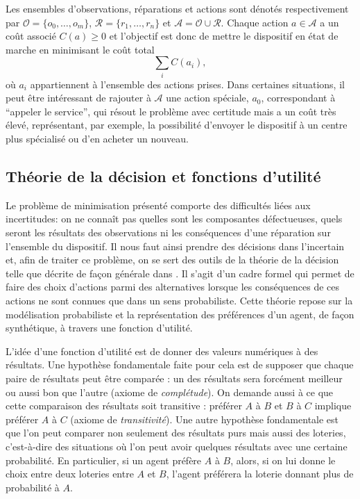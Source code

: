 \documentclass[a4paper,11pt]{article}
\theoremstyle{plain}
\theoremstyle{definition}
\begin{document}
Les ensembles d'observations, réparations et actions sont dénotés respectivement par $\mathcal O = \{ o_0, \dotsc, o_m\}$, $\mathcal R = \{r_1, \dotsc, r_n\}$ et $\mathcal A = \mathcal O \cup \mathcal R$. Chaque action $a \in \mathcal A$ a un coût associé $C(a) \geq 0$ et l'objectif est donc de mettre le dispositif en état de marche en minimisant le coût total \[\sum_i C(a_i),\] où $a_i$ appartiennent à l'ensemble des actions prises. Dans certaines situations, il peut être intéressant de rajouter à $\mathcal A$ une action spéciale, $a_0$, correspondant à ``appeler le service'', qui résout le problème avec certitude mais a un coût très élevé, représentant, par exemple, la possibilité d'envoyer le dispositif à un centre plus spécialisé ou d'en acheter un nouveau.

\subsection{Théorie de la décision et fonctions d'utilité}


Le problème de minimisation présenté comporte des difficultés liées aux incertitudes: on ne connaît pas quelles sont les composantes défectueuses, quels seront les résultats des observations ni les conséquences d'une réparation sur l'ensemble du dispositif. Il nous faut ainsi prendre des décisions dans l'incertain et, afin de traiter ce problème, on se sert des outils de la théorie de la décision telle que décrite de façon générale dans \cite{North_1968}. Il s'agit d'un cadre formel qui permet de faire des choix d'actions parmi des alternatives lorsque les conséquences de ces actions ne sont connues que dans un sens probabiliste. Cette théorie repose sur la modélisation probabiliste et la représentation des préférences d'un agent, de façon synthétique, à travers une fonction d'utilité. 

L'idée d'une fonction d'utilité est de donner des valeurs numériques à des résultats. Une hypothèse fondamentale faite pour cela est de supposer que chaque paire de résultats peut être comparée : un des résultats sera forcément meilleur ou aussi bon que l'autre (axiome de \emph{complétude}). On demande aussi à ce que cette comparaison des résultats soit transitive : préférer $A$ à $B$ et $B$ à $C$ implique préférer $A$ à $C$ (axiome de \emph{transitivité}).
Une autre hypothèse fondamentale est que l'on peut comparer non seulement des résultats purs mais aussi des loteries, c'est-à-dire des situations où l'on peut avoir quelques résultats avec une certaine probabilité. En particulier, si un agent préfère $A$ à $B$, alors, si on lui donne le choix entre deux loteries entre $A$ et $B$, l'agent préférera la loterie donnant plus de probabilité à $A$. 
\end{document}
